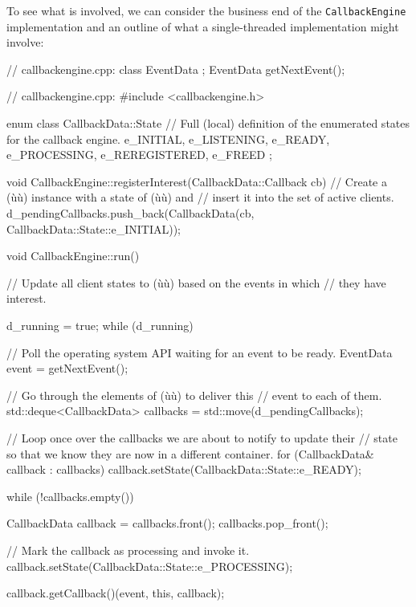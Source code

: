To see what is involved, we can consider the business end of the
\lstinline!CallbackEngine! implementation and an outline of what a
single-threaded implementation might involve:

\begin{emcppshiddenlisting}[emcppsbatch=e6]
// callbackengine.cpp:
class EventData
{
};
EventData getNextEvent();
\end{emcppshiddenlisting}
\begin{emcppslisting}[emcppsbatch=e6]
// callbackengine.cpp:
#include <callbackengine.h>

enum class CallbackData::State
{
    // Full (local) definition of the enumerated states for the callback engine.
    e_INITIAL,
    e_LISTENING,
    e_READY,
    e_PROCESSING,
    e_REREGISTERED,
    e_FREED
};

void CallbackEngine::registerInterest(CallbackData::Callback cb)
{
    // Create a (ù{}ù) instance with a state of (ù{}ù) and
    // insert it into the set of active clients.
    d_pendingCallbacks.push_back(CallbackData(cb, CallbackData::State::e_INITIAL));
}

void CallbackEngine::run()
{
    // Update all client states to (ù{}ù) based on the events in which
    // they have interest.

    d_running = true;
    while (d_running)
    {
        // Poll the operating system API waiting for an event to be ready.
        EventData event = getNextEvent();

        // Go through the elements of (ù{}ù) to deliver this
        // event to each of them.
        std::deque<CallbackData> callbacks = std::move(d_pendingCallbacks);

        // Loop once over the callbacks we are about to notify to update their
        // state so that we know they are now in a different container.
        for (CallbackData& callback : callbacks)
        {
            callback.setState(CallbackData::State::e_READY);
        }

        while (!callbacks.empty())
        {
            CallbackData callback = callbacks.front();
            callbacks.pop_front();

            // Mark the callback as processing and invoke it.
            callback.setState(CallbackData::State::e_PROCESSING);

            callback.getCallback()(event, this, callback);

}}}
\end{emcppslisting}
